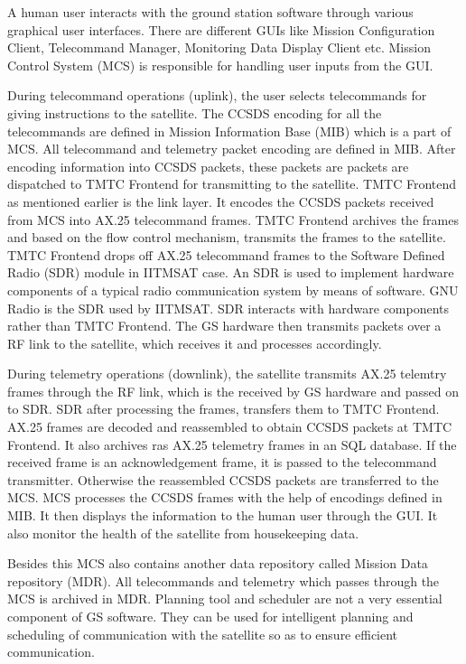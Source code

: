 \documentclass[BTech]{iitmdiss}
\begin{document}
A human user interacts with the ground station software through various graphical user interfaces. There are different GUIs like Mission Configuration Client, Telecommand Manager, Monitoring Data Display Client etc. Mission Control System (MCS) is responsible for handling user inputs from the GUI. 
\par During telecommand operations (uplink), the user selects telecommands for giving instructions to the satellite. The CCSDS encoding for all the telecommands are defined in Mission Information Base (MIB) which is a part of MCS. All telecommand and telemetry packet encoding are defined in MIB. After encoding information into CCSDS packets, these packets are packets are dispatched to TMTC Frontend for transmitting to the satellite. TMTC Frontend as mentioned earlier is the link layer. It encodes the CCSDS packets received from MCS into AX.25 telecommand frames. TMTC Frontend archives the frames and based on the flow control mechanism, transmits the frames to the satellite. TMTC Frontend drops off AX.25 telecommand frames to the Software Defined Radio (SDR) module in IITMSAT case. An SDR is used to implement hardware components of a typical radio communication system by means of software. GNU Radio is the SDR used by IITMSAT. SDR interacts with hardware components rather than TMTC Frontend. The GS hardware then transmits packets over a RF link to the satellite, which receives it and processes accordingly. 

\par During telemetry operations (downlink), the satellite transmits AX.25 telemtry frames through the RF link, which is the received by GS hardware and passed on to SDR. SDR after processing the frames, transfers them to TMTC Frontend. AX.25 frames are decoded and reassembled to obtain CCSDS packets at TMTC Frontend. It also archives ras AX.25 telemetry frames in an SQL database. If the received frame is an acknowledgement frame, it is passed to the telecommand transmitter. Otherwise the reassembled CCSDS packets are transferred to the MCS. MCS processes the CCSDS frames with the help of encodings defined in MIB. It then displays the information to the human user through the GUI. It also monitor the health of the satellite from housekeeping data.  

\par Besides this MCS also  contains another data repository called Mission Data repository (MDR). All telecommands and telemetry which passes through the MCS is archived in MDR. Planning tool and scheduler are not a very essential component of GS software. They can be used for intelligent planning and scheduling of communication with the satellite so as to ensure efficient communication.
\end{document}

